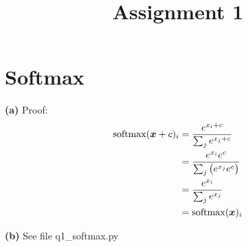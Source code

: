 \documentclass[10pt, a4paper]{ctexart}
\begin{document}
\title{Assignment 1}
\date{}
\author{}
\maketitle

\section{Softmax}
{\bf{(a)}} Proof:
\begin{align*}
    {\rm{softmax}}({\bm{x}}+c)_i &= \frac{e^{x_i+c}}{\sum_je^{x_j+c}}\\
    &=\frac{e^{x_i}e^c}{\sum_j\big(e^{x_j}e^c\big)}\\
    &=\frac{e^{x_i}}{\sum_je^{x_j}}\\
    &={\rm{softmax}}({\bm{x}})_i
\end{align*}\par
{\bf{(b)}} See file q1\_softmax.py
\end{document}
